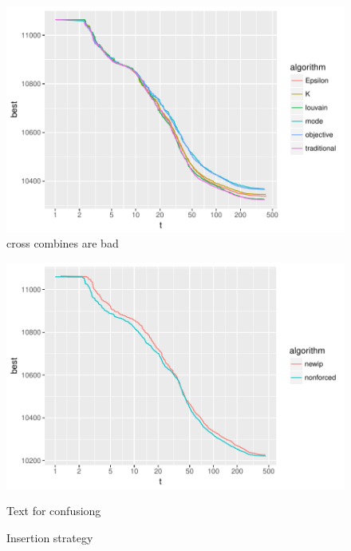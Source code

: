 \documentclass[a4paper,12pt,bibtotoc,titlepage, liststotoc,BCOR7mm,headsepline,pointlessnumbers]{scrbook}
\numberwithin{equation}{section}
\begin{document}
\begin{figure}
\caption{cross combines are bad}
\begin{center}
\includegraphics{bachelorarbeit-badcrosscombines}
\end{center}
\end{figure}

\begin{figure}
\caption{Insertion strategy}
\begin{center}
\includegraphics{bachelorarbeit-insertnewip}
\end{center}
Text for confusiong
\end{figure}
\end{document}
